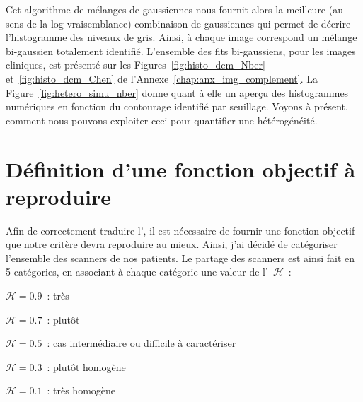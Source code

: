 \documentclass[main.tex]{subfiles}
\begin{document}
Cet algorithme de mélanges de gaussiennes nous fournit alors la meilleure  (au sens de la log-vraisemblance) combinaison de gaussiennes qui permet de décrire l'histogramme des niveaux de gris. Ainsi, à chaque image correspond un mélange bi-gaussien totalement identifié. 
L'ensemble des fits bi-gaussiens, pour les images cliniques, est présenté sur les Figures~\ref{fig:histo_dcm_Nber} et~\ref{fig:histo_dcm_Chen} de l'Annexe~\ref{chap:anx_img_complement}. La Figure~\ref{fig:hetero_simu_nber} donne quant à elle un aperçu des histogrammes numériques en fonction du contourage identifié par seuillage. 
Voyons à présent, comment nous pouvons exploiter ceci pour quantifier une hétérogénéité. 


\section{Définition d'une fonction objectif à reproduire}
Afin de correctement traduire l'\hetero, il est nécessaire de fournir une fonction objectif que notre critère devra reproduire au mieux. Ainsi, j'ai décidé de catégoriser l'ensemble des scanners de nos patients. Le partage des scanners est ainsi fait en 5 catégories, en associant à chaque catégorie une valeur de l'\hetero~$\mathscr{H}$~:
\begin{myitemize}
\item $\mathscr{H}=0.9$~: très \heterogene
\item $\mathscr{H}=0.7$~: plutôt \heterogene
\item $\mathscr{H}=0.5$~: cas intermédiaire ou difficile à caractériser
\item $\mathscr{H}=0.3$~: plutôt homogène
\item $\mathscr{H}=0.1$~: très homogène
\end{myitemize}
\end{document}
